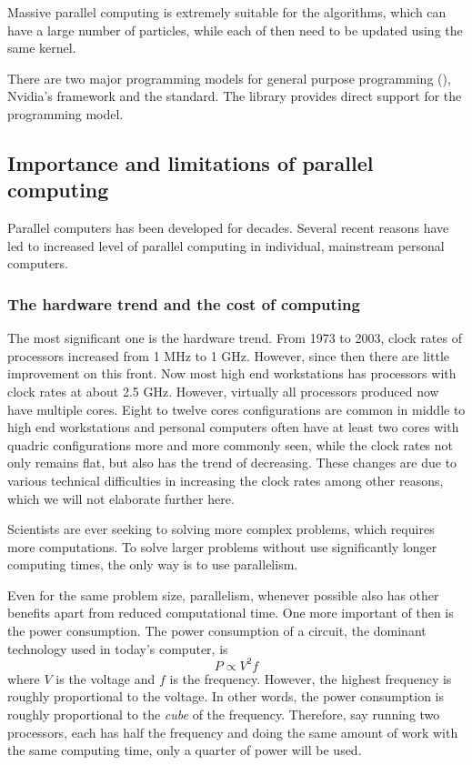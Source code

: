 Massive parallel computing is extremely suitable for the \smc algorithms,
which can have a large number of particles, while each of then need to be
updated using the same \mcmc kernel.

There are two major programming models for general purpose \gpu programming
(\gpgpu), Nvidia's \cuda framework and the \opencl standard. The \vsmc library
provides direct support for the \opencl programming model.

\subsection{Importance and limitations of parallel computing}
\label{sub:Importance and limitations of parallel computing}

Parallel computers has been developed for decades. Several recent reasons have
led to increased level of parallel computing in individual, mainstream
personal computers.

\subsubsection{The hardware trend and the cost of computing}
\label{ssub:The hardware trend and the cost of computing}

The most significant one is the hardware trend. From 1973 to 2003, clock rates
of processors increased from 1 MHz to 1 GHz. However, since then there are
little improvement on this front. Now most high end workstations has
processors with clock rates at about 2.5 GHz. However, virtually all
processors produced now have multiple cores. Eight to twelve cores
configurations are common in middle to high end workstations and personal
computers often have at least two cores with quadric configurations more and
more commonly seen, while the clock rates not only remains flat, but also has
the trend of decreasing. These changes are due to various technical
difficulties in increasing the clock rates among other reasons, which we will
not elaborate further here.

Scientists are ever seeking to solving more complex problems, which requires
more computations. To solve larger problems without use significantly longer
computing times, the only way is to use parallelism.

Even for the same problem size, parallelism, whenever possible also has other
benefits apart from reduced computational time. One more important of then is
the power consumption. The power consumption of a \cmos circuit, the dominant
technology used in today's computer, is
\begin{equation}
  P \propto V^2f
\end{equation}
where $V$ is the voltage and $f$ is the frequency. However, the highest
frequency is roughly proportional to the voltage. In other words, the power
consumption is roughly proportional to the \emph{cube} of the frequency.
Therefore, say running two processors, each has half the frequency and doing
the same amount of work with the same computing time, only a quarter of power
will be used.

